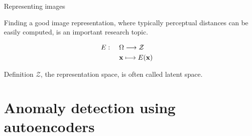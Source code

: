 \documentclass[xcolor=pdftex,dvipsnames,table,mathserif,aspectratio=169]{beamer}
\begin{document}
\begin{frame}{Representing images}

\begin{block}{}
  Finding a good image representation, where typically perceptual distances can be easily computed, is an important research topic.
\end{block}

    \[
    \begin{split}
    E: & ~~~~\Omega \longrightarrow \mathcal{Z} \\
    & ~~~~ \mathbf{x} \longmapsto E(\mathbf{x})
    \end{split}
    \]

\begin{block}{Definition}
$\mathcal{Z}$, the representation space, is often called \alert{latent} space.
\end{block}

\end{frame}



\section{Anomaly detection using autoencoders}
\end{document}
